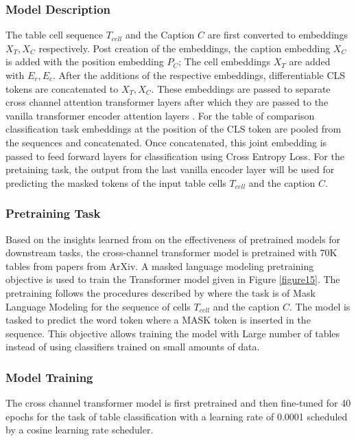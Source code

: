 \subsubsection{Model Description}
The table cell sequence $T_{cell}$ and the Caption $C$ are first converted to embeddings $X_T, X_C$ respectively. Post creation of the embeddings,  the caption embedding  $X_C$ is added with the position embedding $P_C$; The cell embeddings $X_T$ are added with $E_r,E_c$. After the additions of the respective embeddings, differentiable CLS tokens are concatenated to $X_T,X_C$.
These embeddings are passed to separate cross channel attention transformer layers \parencite{tsai2019multimodal} after which they are passed to the vanilla transformer encoder attention layers \parencite{vaswani2017attention}. For the table of comparison classification task embeddings at the position of the CLS token are pooled from the sequences and concatenated. Once concatenated, this joint embedding is passed to feed forward layers for classification using Cross Entropy Loss. For the pretaining task, the output from the last vanilla encoder layer will be used for predicting the masked tokens of the input table cells $T_{cell}$ and the caption $C$.


\subsubsection{Pretraining Task}
Based on the insights learned from \cite{hernandez2021scaling} on the effectiveness of pretrained models for downstream tasks, the cross-channel transformer model is pretrained with 70K tables from papers from ArXiv. A masked language modeling pretraining objective is used to train the Transformer model given in Figure \ref{figure15}. The pretraining follows the procedures described by \cite{deng2020turl} where the task is of Mask Language Modeling for the sequence of cells $T_{cell}$ and the caption $C$. The model is tasked to predict the word token where a MASK token is inserted in the sequence.  This objective allows training the model with Large number of tables instead of using classifiers trained on small amounts of data. 

\subsubsection{Model Training}
The cross channel transformer model is first pretrained and then fine-tuned for 40 epochs for the task of table classification with a learning rate of 0.0001 scheduled by a cosine learning rate scheduler. 

